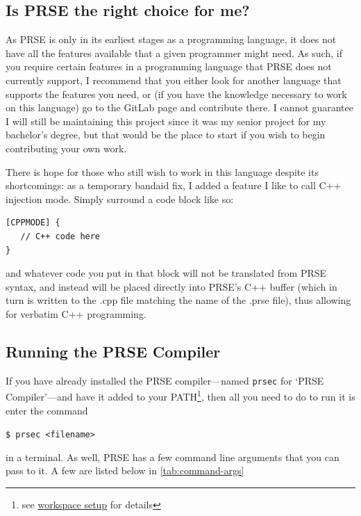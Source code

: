 \documentclass[letterpaper, 12pt]{article}
\begin{document}
\subsection{Is PRSE the right choice for me?}
As PRSE is only in its earliest stages as a programming language, it does not have all the features
available that a given programmer might need. As such, if you require certain features in a
programming language that PRSE does not currently support, I recommend that you either look for
another language that supports the features you need, or (if you have the knowledge necessary to
work on this language) go to the GitLab page %
and contribute there. I cannot guarantee I will still be maintaining this project since it was my
senior project for my bachelor's degree, but that would be the place to start if you wish to begin
contributing your own work.\linebreak

There is hope for those who still wish to work in this language despite its shortcomings: as a
temporary bandaid fix, I added a feature I like to call C++ injection mode. Simply surround a code
block like so:

\begin{lstlisting}
[CPPMODE] {
   // C++ code here
}
\end{lstlisting}

and whatever code you put in that block will not be translated from PRSE syntax, and instead will be
placed directly into PRSE's C++ buffer (which in turn is written to the .cpp file matching the name
of the .prse file), thus allowing for verbatim C++ programming.

\subsection{Running the PRSE Compiler}

If you have already installed the PRSE compiler---named \texttt{prsec} for `PRSE Compiler'---and
have it added to your PATH\footnote{see \hyperref[sec:prse-workspace-setup]{workspace setup} for
details}, then all you need to do to run it is enter the command\linebreak

\texttt{\$ prsec <filename>}\linebreak

in a terminal. As well, PRSE has a few command line arguments that you can pass to it. A few are
listed below in \autoref{tab:command-args}
\end{document}
